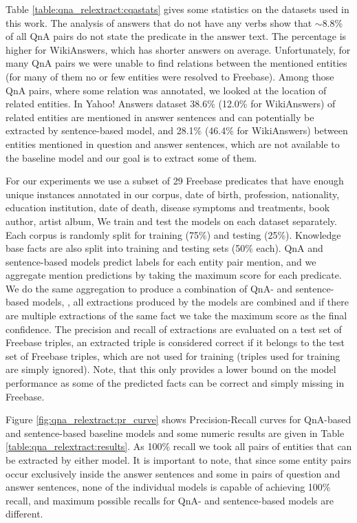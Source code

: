 Table \ref{table:qna_relextract:cqastats} gives some statistics on the datasets used in this work.
The analysis of answers that do not have any verbs show that $\sim$8.8\% of all QnA pairs do not state the predicate in the answer text.
The percentage is higher for WikiAnswers, which has shorter answers on average.
Unfortunately, for many QnA pairs we were unable to find relations between the mentioned entities (for many of them no or few entities were resolved to Freebase).
Among those QnA pairs, where some relation was annotated, we looked at the location of related entities.
In Yahoo! Answers dataset 38.6\% (12.0\% for WikiAnswers) of related entities are mentioned in answer sentences and can potentially be extracted by sentence-based model, and 28.1\% (46.4\% for WikiAnswers) between entities mentioned in question and answer sentences, which are not available to the baseline model and our goal is to extract some of them.

For our experiments we use a subset of 29 Freebase predicates that have enough unique instances annotated in our corpus, \eg date of birth, profession, nationality, education institution, date of death, disease symptoms and treatments, book author, artist album, \etc
We train and test the models on each dataset separately.
Each corpus is randomly split for training (75\%) and testing (25\%).
Knowledge base facts are also split into training and testing sets (50\% each).
QnA and sentence-based models predict labels for each entity pair mention, and we aggregate mention predictions by taking the maximum score for each predicate.
We do the same aggregation to produce a combination of QnA- and sentence-based models, \ie, all extractions produced by the models are combined and if there are multiple extractions of the same fact we take the maximum score as the final confidence.
The precision and recall of extractions are evaluated on a test set of Freebase triples, \ie an extracted triple is considered correct if it belongs to the test set of Freebase triples, which are not used for training (triples used for training are simply ignored).
Note, that this only provides a lower bound on the model performance as some of the predicted facts can be correct and simply missing in Freebase.

Figure \ref{fig:qna_relextract:pr_curve} shows Precision-Recall curves for QnA-based and sentence-based baseline models and some numeric results are given in Table \ref{table:qna_relextract:results}.
As 100\% recall we took all pairs of entities that can be extracted by either model.
It is important to note, that since some entity pairs occur exclusively inside the answer sentences and some in pairs of question and answer sentences, none of the individual models is capable of achieving 100\% recall, and maximum possible recalls for QnA- and sentence-based models are different.

